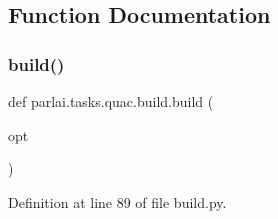 \subsection{Function Documentation}
\mbox{\label{namespaceparlai_1_1tasks_1_1quac_1_1build_a86e9b7d4a167a4dc22e925770ce42824}} 
\subsubsection{\texorpdfstring{build()}{build()}}
{\footnotesize\ttfamily def parlai.\+tasks.\+quac.\+build.\+build (\begin{DoxyParamCaption}\item[{}]{opt }\end{DoxyParamCaption})}



Definition at line 89 of file build.\+py.



